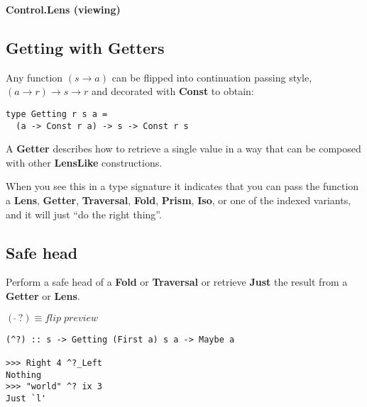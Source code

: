 

\addtolength{\wpXoffset}{5.5cm}
\addtolength{\wpYoffset}{13.1cm}





{\huge \bfseries Control.Lens (viewing) \\[0.2cm]}

\HRule%

\begin{multicols}{2}

\begin{box1}
\subsection *{Getting with Getters}

Any function $(s \to a)$ can be flipped into continuation passing style, $(a \to r)
\to s \to r$ and decorated with \textbf{Const} to obtain:

\begin{verbatim}
type Getting r s a =
  (a -> Const r a) -> s -> Const r s
\end{verbatim}
A \textbf{Getter} describes how to retrieve a single value in a way that can be composed
with other \textbf{LensLike} constructions.

When you see this in a type signature it indicates that you can pass the
function a \textbf{Lens}, \textbf{Getter}, \textbf{Traversal}, \textbf{Fold},
\textbf{Prism}, \textbf{Iso}, or one of the indexed
variants, and it will just ``do the right thing''.
\end{box1}

\begin{box2}
\subsection *{Safe head}
Perform a safe head of a \textbf{Fold} or \textbf{Traversal} or retrieve
\textbf{Just} the result from a \textbf{Getter} or \textbf{Lens}.

$ (\ \hat{}\,?) \equiv flip\;preview $

\begin{verbatim}
(^?) :: s -> Getting (First a) s a -> Maybe a

>>> Right 4 ^?_Left
Nothing
>>> "world" ^? ix 3
Just `l'
\end{verbatim}
\end{box2}


\end{multicols}
